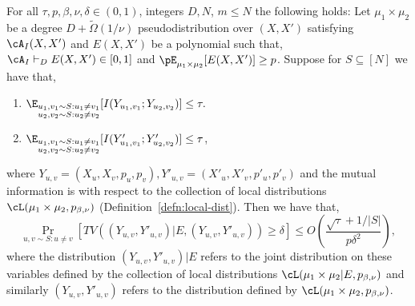 \begin{lemma}
For all $\tau,p,\beta,\nu,\delta \in (0,1)$, integers $D,N$, $m \leq N$ the following holds: Let $\mu_1 \times \mu_2$ be a degree $D+\widetilde{\Omega}(1/\nu)$ pseudodistribution over $(X,X')$ satisfying $\cA_I(X,X')$ and $E(X,X')$ be a polynomial such that, $\cA_I \vdash_D E(X,X') \in [0,1]$ and $\pE_{\mu_1 \times \mu_2}[E(X,X')] \geq p$. Suppose for $S \subseteq [N]$ we have that, 
\begin{enumerate}
\item $\E_{\substack{u_1,v_1 \sim S: u_1 \neq v_1\\ u_2,v_2 \sim S: u_2 \neq v_2}}[I(Y_{u_1,v_1};Y_{u_2,v_2})] \leq \tau.$
\item $\E_{\substack{u_1,v_1 \sim S: u_1 \neq v_1\\ u_2,v_2 \sim S: u_2 \neq v_2}}[I(Y'_{u_1,v_1};Y'_{u_2,v_2})] \leq \tau$,
\end{enumerate}
where $Y_{u,v} = (X_u,X_v,p_u,p_v), Y'_{u,v} = (X'_u,X'_v,p'_u,p'_v)$ and the mutual information is with respect to the collection of local distributions $\cL(\mu_1 \times \mu_2,p_{\beta,\nu})$ (Definition~\ref{defn:local-dist}). Then we have that, 
\[\Pr_{u,v \sim S: u \neq v}[ TV((Y_{u,v},Y'_{u,v})|E , (Y_{u,v},Y'_{u,v})) \geq \delta] \leq O\left(\frac{\sqrt{\tau}+ 1/|S|}{p\delta^2}\right),\]
where the distribution $(Y_{u,v},Y'_{u,v})|E$ refers to the joint distribution on these variables defined by the collection of local distributions $\cL(\mu_1 \times \mu_2|E, p_{\beta,\nu})$ and similarly $(Y_{u,v},Y'_{u,v})$ refers to the distribution defined by $\cL(\mu_1 \times \mu_2,p_{\beta,\nu})$.
\end{lemma}

